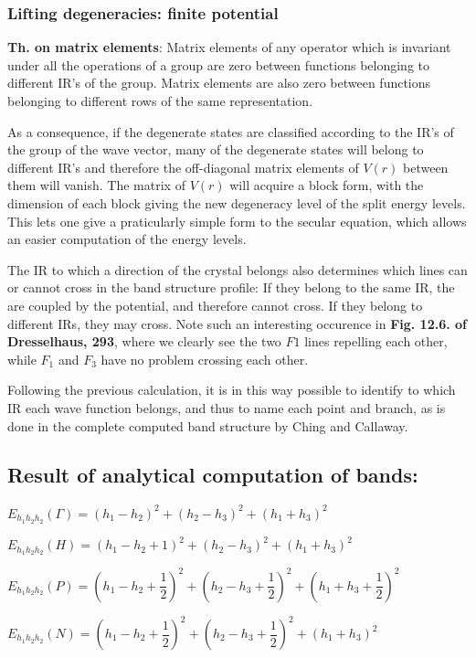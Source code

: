 \documentclass{article}
\begin{document}
    \subsubsection{Lifting degeneracies: finite potential}


    \textbf{Th. on matrix elements}: Matrix elements of any operator which
is invariant under all the operations of a group are zero between
functions belonging to different IR's of the group. Matrix elements are
also zero between functions belonging to different rows of the same
representation.

As a consequence, if the degenerate states are classified according to
the IR's of the group of the wave vector, many of the degenerate states
will belong to different IR's and therefore the off-diagonal matrix
elements of $V(r)$ between them will vanish. The matrix of $V(r)$ will
acquire a block form, with the dimension of each block giving the new
degeneracy level of the split energy levels. This lets one give a
praticularly simple form to the secular equation, which allows an easier
computation of the energy levels.

The IR to which a direction of the crystal belongs also determines which
lines can or cannot cross in the band structure profile: If they belong
to the same IR, the are coupled by the potential, and therefore cannot
cross. If they belong to different IRs, they may cross. Note such an
interesting occurence in \textbf{Fig. 12.6. of Dresselhaus, 293}, where
we clearly see the two $F1$ lines repelling each other, while $F_1$ and
$F_3$ have no problem crossing each other.

Following the previous calculation, it is in this way possible to
identify to which IR each wave function belongs, and thus to name each
point and branch, as is done in the complete computed band structure by
Ching and Callaway.


    \subsection{Result of analytical computation of bands:}


    $E_{h_1 h_2 h_2}(\Gamma) = (h_1 - h_2)^2 + (h_2-h_3)^2 + (h_1+h_3)^2$

$E_{h_1 h_2 h_2}(H) = (h_1 - h_2 + 1)^2 + (h_2-h_3)^2 + (h_1+h_3)^2$

$E_{h_1 h_2 h_2}(P) = (h_1 - h_2 + \dfrac{1}{2})^2 + (h_2-h_3+\dfrac{1}{2})^2 + (h_1+h_3+\dfrac{1}{2})^2$

$E_{h_1 h_2 h_2}(N) = (h_1 - h_2 + \dfrac{1}{2})^2 + (h_2-h_3+\dfrac{1}{2})^2 + (h_1+h_3)^2$
\end{document}
